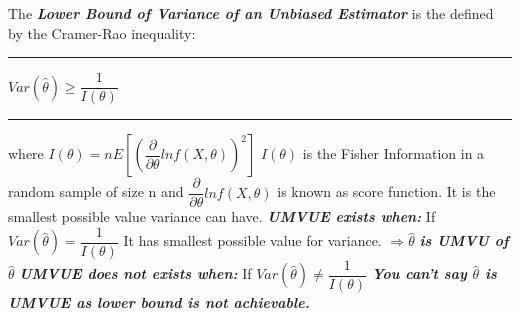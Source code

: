 \documentclass[]{article}
\begin{document}
\Large The \textbf{\textit{Lower Bound of Variance of an Unbiased Estimator}} is the defined by the Cramer-Rao inequality:
\newline
\newline\Large\rule{3cm}{0pt} $Var (\hat\theta) \geq  \dfrac{  1   }{ I (\theta) }$ \Large\rule{1cm}{0pt} where $I (\theta) = nE \left[\left(  \dfrac{  \partial  }{ \partial\theta } ln  f(X,\theta)     \right)^2 \right] $ 
\newline
\newline
\newline $I (\theta)$ is the Fisher Information in a random sample of size n and $ \dfrac{  \partial  }{ \partial\theta } ln  f(X,\theta)$ is known as score function. It is the smallest possible value variance can have. 
\newline
\newline
\textbf{\textit{UMVUE exists when:}}
\newline
\newline If $Var (\hat\theta) =  \dfrac{  1   }{ I (\theta) }$ It has smallest possible value for variance.
\newline
\newline $\Longrightarrow  \hat\theta$ \textbf{\textit{ is UMVU of }} $ \hat\theta$ 
\newline
\newline
\textbf{\textit{UMVUE does not exists when:}}
\newline
\newline If $Var (\hat\theta) \neq  \dfrac{  1   }{ I (\theta) }$  \textbf{\textit{You can't say $\hat\theta$ is UMVUE as lower bound is not achievable.}}


\newpage
\end{document}
